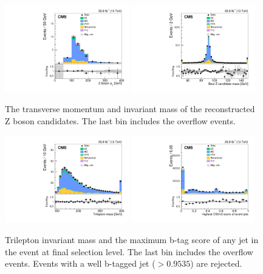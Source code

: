 \clearpage
\begin{figure}[!t]
\centering
\includegraphics[width=0.48\textwidth]{figures/dibosons/wz3l/pTZ.pdf}
\includegraphics[width=0.48\textwidth]{figures/dibosons/wz3l/minMassZ_Nminus1.pdf}
\caption{The transverse momentum and invariant mass of the reconstructed Z boson candidates.
The last bin includes the overflow events.
\label{fig:wz3l_z}}
\end{figure}

\begin{figure}[!hb]
\centering
\includegraphics[width=0.48\textwidth]{figures/dibosons/wz3l/m3l_Nminus1.pdf}
\includegraphics[width=0.48\textwidth]{figures/dibosons/wz3l/bDiscrMax_Nminus1.pdf}
\caption{Trilepton invariant mass and the maximum b-tag score of any jet in the event
at final selection level.
The last bin includes the overflow events. Events with a well b-tagged jet ($>0.9535$) are rejected.
\label{fig:wz3l_purity}}
\end{figure}

